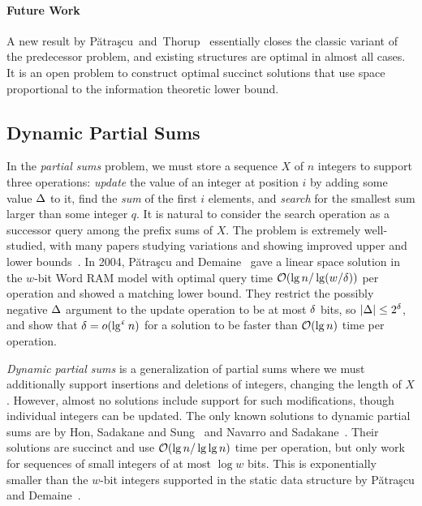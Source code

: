 \paragraph{Future Work}
A new result by Pătraşcu~and~Thorup~\cite{patrascu2014dynamic} essentially closes the classic variant of the predecessor problem, and existing structures are optimal in almost all cases. It is an open problem to construct optimal succinct solutions that use space proportional to the information theoretic lower bound.


\subsection{Dynamic Partial Sums}\label{sec:intro:partialsums}
In the \emph{partial sums} problem, we must store a sequence $X$ of $n$ integers to support three operations: \emph{update} the value of an integer at position $i$ by adding some value $\Delta$ to it, find the \emph{sum} of the first $i$ elements, and \emph{search} for the smallest sum larger than some integer $q$. It is natural to consider the search operation as a successor query among the prefix sums of $X$. 
The problem is extremely well-studied, with many papers studying variations and showing improved upper and lower bounds~\cite{dietz1989optimal,raman2001succinct, husfeldt2003new,fredman1989cell,hon2011a,husfeldt1996lower,fenwick1994new,puaatracscu2004tight,chan2010counting}.
In 2004, Pătraşcu and Demaine~\cite{puaatracscu2004tight} gave a linear space solution in the $w$-bit Word RAM model with optimal query time $\mathcal{O}(\lg n / \lg (w / \delta))$ per operation and showed a matching lower bound. 
They restrict the possibly negative $\Delta$ argument to the update operation to be at most $\delta$ bits, so $|\Delta| \leq 2^\delta$, and show that $\delta = o(\lg^\upvarepsilon n)$ for a solution to be faster than $\mathcal{O}(\lg n)$ time per operation. 

\emph{Dynamic partial sums} is a generalization of partial sums where we must additionally support insertions and deletions of integers, changing the length of $X$. However, almost no solutions include support for such modifications, though individual integers can be updated. The only known solutions to dynamic partial sums are by Hon, Sadakane and Sung~\cite{hon2011a} and Navarro and Sadakane~\cite{navarro2014fully}. Their solutions are succinct and use $\mathcal{O}(\lg n / \lg \lg n)$ time per operation, but only work for sequences of small integers of at most $\log w$ bits. This is exponentially smaller than the $w$-bit integers supported in the static data structure by Pătraşcu and Demaine~\cite{puaatracscu2004tight}.



